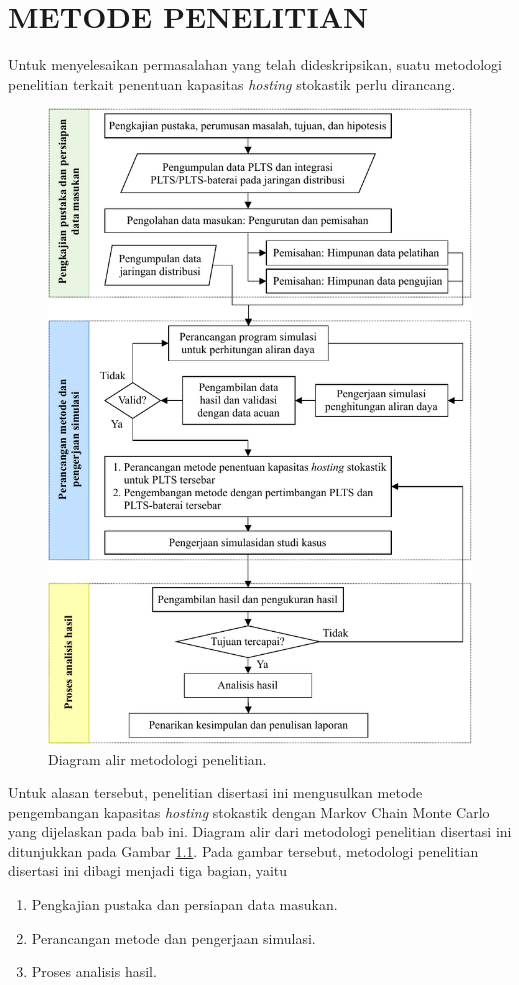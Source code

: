 \chapter{METODE PENELITIAN}
Untuk menyelesaikan permasalahan yang telah dideskripsikan, suatu metodologi penelitian terkait penentuan kapasitas \textit{\textit{hosting}} stokastik perlu dirancang.
\begin{figure}[!b]
	\centering
	\includegraphics[width=1\textwidth]{Fig/fcpenelitian}
	\caption{Diagram alir metodologi penelitian.}
	\label{tahapan}
\end{figure}
Untuk alasan tersebut, penelitian disertasi ini mengusulkan metode pengembangan kapasitas \textit{\textit{hosting}} stokastik dengan Markov Chain Monte Carlo yang dijelaskan pada bab ini. Diagram alir dari metodologi penelitian disertasi ini ditunjukkan pada Gambar \ref{tahapan}. Pada gambar tersebut, metodologi penelitian disertasi ini dibagi menjadi tiga bagian, yaitu
\begin{enumerate}
	\item Pengkajian pustaka dan persiapan data masukan.
	\item Perancangan metode dan pengerjaan simulasi.
	\item Proses analisis hasil.
\end{enumerate}

